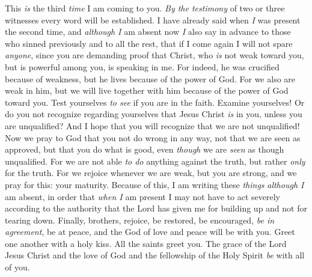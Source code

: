 \begin{biblechapter} %
 This \textit{is} the third \textit{time} I am coming to you. \textit{By the testimony} of two or three witnesses every word will be established.
\verse I have already said when \textit{I} was present the second time, and \textit{although I} am absent now \textit{I} also say in advance to those who sinned previously and to all the rest, that if I come again I will not spare \textit{anyone},
\verse since you are demanding proof that Christ, who \textit{is} not weak toward you, but is powerful among you, is speaking in me.
\verse For indeed, he was crucified because of weakness, but he lives because of the power of God. For we also are weak in him, but we will live together with him because of the power of God toward you.
\verse Test yourselves \textit{to see} if you are in the faith. Examine yourselves! Or do you not recognize regarding yourselves that Jesus Christ \textit{is} in you, unless you are unqualified?
\verse And I hope that you will recognize that we are not unqualified!
\verse Now we pray to God that you not do wrong in any way, not that we are seen as approved, but that you do what is good, even \textit{though} we are \textit{seen} as though unqualified.
\verse For we are not able \textit{to do} anything against the truth, but rather \textit{only} for the truth.
\verse For we rejoice whenever we are weak, but you are strong, and we pray for this: your maturity.
\verse Because of this, I am writing these \textit{things} \textit{although I} am absent, in order that \textit{when I} am present I may not have to act severely according to the authority that the Lord has given me for building up and not for tearing down.
 Finally, brothers, rejoice, be restored, be encouraged, \textit{be in agreement}, be at peace, and the God of love and peace will be with you.
\verse Greet one another with a holy kiss. All the saints greet you.
\verse The grace of the Lord Jesus Christ and the love of God and the fellowship of the Holy Spirit \textit{be} with all of you.
\end{biblechapter}


